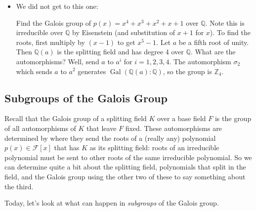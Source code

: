 \documentclass[12pt]{article}
\theoremstyle{plain}
\theoremstyle{definition}
\theoremstyle{remark}
\newcommand{\ex}{\noindent{\bf Ex: }}
\def\Z{\mathbb Z}
\def\Q{\mathbb Q}
\def\F{\mathbb F}
\def\F{\mathscr{F}}
\DeclareMathOperator{\Gal}{Gal}
\newcommand{\todayis}[1]{\clearpage{\rhead{\footnotesize #1}}}
\begin{document}
\begin{itemize}
\begin{proof}
Consider $\Gal(E:F(a))$.  This is the set of all automorphisms of $E$ that fix $F(a)$.   By our inductive hypothesis, we have $|\Gal(E:F(a))| = [E:F(a)] = n/m$.  Each of these composed with an isomorphism between $F(a)$ and $F(b)$ gives an element of $\Gal(E:F)$.
\end{proof}

\item We did not get to this one:

\ex Find the Galois group of $p(x) = x^4 + x^3 + x^2 + x + 1$ over $\Q$.  Note this is irreducible over $\Q$ by Eisenstein (and substitution of $x+1$ for $x$).  To find the roots, first multiply by $(x-1)$ to get $x^5 - 1$.  Let $a$ be a fifth root of unity.  Then $\Q(a)$ is the splitting field and has degree 4 over $\Q$.  What are the automorphisms?  Well, send $a$ to $a^i$ for $i = 1,2,3,4$.  The automorphism $\sigma_2$ which sends $a$ to $a^2$ generates $\Gal(\Q(a):\Q)$, so the group is $\Z_4$.

%

\end{itemize}

\todayis{Monday, February 11}

\subsection*{Subgroups of the Galois Group}

Recall that the Galois group of a splitting field $K$ over a base field $F$ is the group of all automorphisms of $K$ that leave $F$ fixed.  These automorphisms are determined by where they send the roots of a (really any) polynomial $p(x) \in \F[x]$ that has $K$ as its splitting field: roots of an irreducible polynomial must be sent to other roots of the same irreducible polynomial.  So we can determine quite a bit about the splitting field, polynomials that split in the field, and the Galois group using the other two of these to say something about the third.

Today, let's look at what can happen in \emph{subgroups} of the Galois group.
\end{document}
